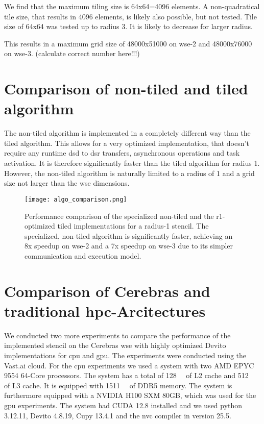 We find that the maximum tiling size  is 64x64=4096 elements.
A non-quadratical tile size, that results in 4096 elements, is likely also possible, but not tested.
Tile size of 64x64 was tested up to radius 3. It is likely to decrease for larger radius.

This results in a maximum grid size of 48000x51000 on wse-2 and 48000x76000 on wse-3. (calculate correct number here!!!)

\section{Comparison of non-tiled and tiled algorithm}

The non-tiled algorithm is implemented in a completely different way than the tiled algorithm.
This allows for a very optimized implementation, that doesn't require any runtime \ac{dsd} to \ac{dsr} transfers, asynchronous operations and task activation.
It is therefore significantly faster than the tiled algorithm for radius 1.
However, the non-tiled algorithm is naturally limited to a radius of 1 and a grid size not larger than the \ac{wse} dimensions.

\begin{figure}[h]
    \centering
    \texttt{[image: algo\_comparison.png]}
    \caption{Performance comparison of the specialized non-tiled and the r1-optimized tiled implementations for a radius-1 stencil. The specialized, non-tiled algorithm is significantly faster, achieving an 8x speedup on \ac{wse}-2 and a 7x speedup on \ac{wse}-3 due to its simpler communication and execution model.}
    \label{fig:algo_comparison}
\end{figure}

\section{Comparison of Cerebras and traditional \ac{hpc}-Arcitectures}
We conducted two more experiments to compare the performance of the implemented stencil on the Cerebras \ac{wse} with highly optimized Devito implementations for \ac{cpu} and \ac{gpu}. The experiments were conducted using the Vast.ai cloud.
For the \ac{cpu} experiments we used a system with two AMD EPYC 9554 64-Core processors. The system has a total of \qty{128}{\mega\byte} of L2 cache and \qty{512}{\mega\byte} of L3 cache. It is equipped with \qty{1511}{\giga\byte} of DDR5 memory.
The system is furthermore equipped with a NVIDIA H100 SXM 80GB, which was used for the \ac{gpu} experiments. The system had CUDA 12.8 installed and we used python 3.12.11, Devito 4.8.19, Cupy 13.4.1 and the nvc compiler in version 25.5.

